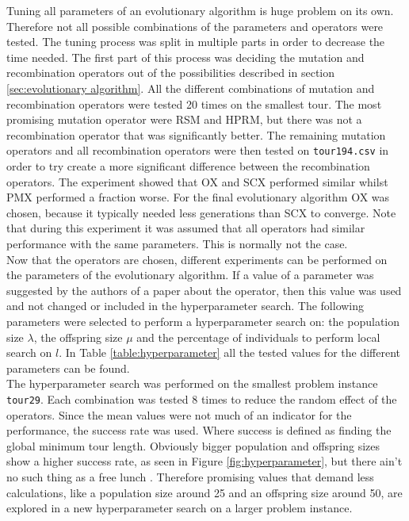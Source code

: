 \documentclass[a4paper,10pt]{article}
\begin{document}
Tuning all parameters of an evolutionary algorithm is huge problem on its own. Therefore not all possible combinations of the parameters and operators were tested. The tuning process was split in multiple parts in order to decrease the time needed. The first part of this process was deciding the mutation and recombination operators out of the possibilities described in section \ref{sec:evolutionary algorithm}. All the different combinations of mutation and recombination operators were tested 20 times on the smallest tour. The most promising mutation operator were RSM and HPRM, but there was not a recombination operator that was significantly better. The remaining mutation operators and all recombination operators were then tested on \texttt{tour194.csv} in order to try create a more significant difference between the recombination operators. The experiment showed that OX and SCX performed similar whilst PMX performed a fraction worse. For the final evolutionary algorithm OX was chosen, because it typically needed less generations than SCX to converge. Note that during this experiment it was assumed that all operators had similar performance with the same parameters. This is normally not the case.\\

Now that the operators are chosen, different experiments can be performed on the parameters of the evolutionary algorithm. If a value of a parameter was suggested by the authors of a paper about the operator, then this value was used and not changed or included in the hyperparameter search. The following parameters were selected to perform a hyperparameter search on: the population size $\lambda$, the offspring size $\mu$ and the percentage of individuals to perform local search on $l$. In Table \ref{table:hyperparameter} all the tested values for the different parameters can be found.\\
The hyperparameter search was performed on the smallest problem instance \texttt{tour29}. Each combination was tested 8 times to reduce the random effect of the operators. Since the mean values were not much of an indicator for the performance, the success rate was used. Where success is defined as finding the global minimum tour length. Obviously bigger population and offspring sizes show a higher success rate, as seen in Figure \ref{fig:hyperparameter}, but there ain't no such thing as a free lunch \cite{freelunch}. Therefore promising values that demand less calculations, like a population size around 25 and an offspring size around 50, are explored in a new hyperparameter search on a larger problem instance.\\
\end{document}
